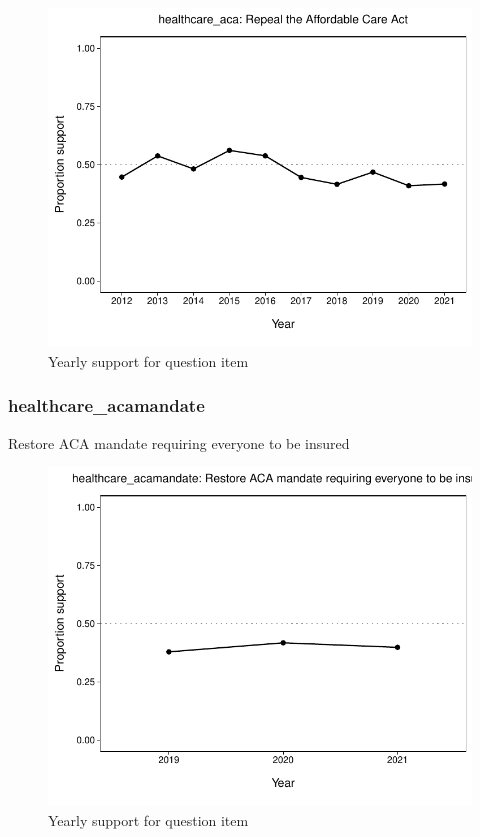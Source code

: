 \documentclass[
  12pt]{article}
\begin{document}
\begin{figure}

{\centering \includegraphics{error-checking_files/figure-latex/unnamed-chunk-3-16} 

}

\caption{Yearly support for question item}\label{fig:unnamed-chunk-3-16}
\end{figure}

\hypertarget{healthcare_acamandate}{%
\subsubsection{healthcare\_acamandate}\label{healthcare_acamandate}}

Restore ACA mandate requiring everyone to be insured

\begin{figure}

{\centering \includegraphics{error-checking_files/figure-latex/unnamed-chunk-3-17} 

}

\caption{Yearly support for question item}\label{fig:unnamed-chunk-3-17}
\end{figure}
\end{document}

